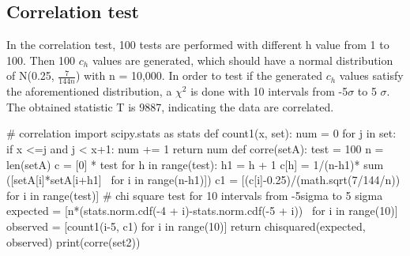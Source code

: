 \subsection*{Correlation test}
In the correlation test, 100 tests are performed with different h value from 1 to 100. Then 100 $c_h$ values are generated, which should have a normal distribution of N(0.25, $\frac{7}{144n}$) with n = 10,000. In order to test if the generated $c_h$ values satisfy the aforementioned distribution, a $\chi^2$ is done with 10 intervals from -5$\sigma$ to 5 $\sigma$. The obtained statistic T is 9887, indicating the data are correlated.
\begin{python}
# correlation
import scipy.stats as stats
def count1(x, set):
    num = 0
    for j in set:
        if x <=j and j < x+1:
            num += 1
    return num
def corre(setA):
    test = 100
    n = len(setA)
    c = [0] * test
    for h in range(test):
        h1 = h + 1
        c[h] = 1/(n-h1)* sum ([setA[i]*setA[i+h1] \
                               for i in range(n-h1)])  
    c1 = [(c[i]-0.25)/(math.sqrt(7/144/n)) for i in range(test)]   
    # chi square test for 10 intervals from -5sigma to 5 sigma
    expected = [n*(stats.norm.cdf(-4 + i)-stats.norm.cdf(-5 + i)) \
                for i in range(10)]
    observed = [count1(i-5, c1) for i in range(10)]
    return chisquared(expected, observed)
print(corre(set2))
\end{python}

